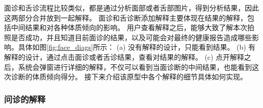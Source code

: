 面诊和舌诊流程比较类似，都是通过分析面部或者舌部图片，得到分析结果，因此这两部分合并放到一起解释。
面诊和舌诊断添加解释主要体现在结果的解释，包括中间结果和对各种体质倾向的影响。
用户查看解释之后，能够大致了解本次拍照是否成功，并且知道目前面诊的结果，以及可能会对最终的健康报告造成哪些影响。具体如图\ref{fig:face_diags}所示：
(a) 没有解释的设计，只能看到结果。
(b) 有解释的设计，通过点击面诊或者舌诊结果，查看对结果的解释。
(c) 点开解释之后，系统会弹窗进行详细的解释，不仅可以看到当面诊断的中间结果，也能看到这次诊断的体质倾向得分。
接下来介绍该原型中各个解释的细节具体如何实现。


\subsubsection{问诊的解释}

\begin{figure}[htbp]
    \centering

\end{figure}
